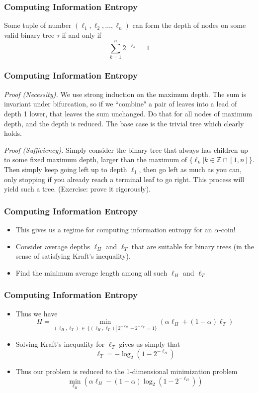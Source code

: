 \documentclass[xcolor=dvipsnames]{beamer}
\begin{document}
	\begin{frame}
	\frametitle{Computing Information Entropy}
    	\begin{theorem}
	    Some tuple of number $(\ell_1, \ell_2, \dots, \ell_n)$ can form the depth of nodes on some valid binary tree $\tau$ if and only if $$ \sum_{k=1}^n 2^{-\ell_k} = 1$$      	
	    \end{theorem}
	\end{frame}
	
	\begin{frame}
	\frametitle{Computing Information Entropy}
    \textit{Proof (Necessity).} We use strong induction on the maximum depth. The sum is invariant under bifurcation, so if we ``combine" a pair of leaves into a lead of depth 1 lower, that leaves the sum unchanged. Do that for all nodes of maximum depth, and the depth is reduced. The base case is the trivial tree which clearly holds. 
    
    \textit{Proof (Sufficiency).} Simply consider the binary tree that always has children up to some fixed maximum depth, larger than the maximum of $\{\ell_k | k \in \mathbb{Z} \cap [1, n] \}$. Then simply keep going left up to depth $\ell_1$, then go left as much as you can, only stopping if you already reach a terminal leaf to go right. This process will yield such a tree. (Exercise: prove it rigorously). 
	\end{frame}
	
	\begin{frame}
	\frametitle{Computing Information Entropy}
	    \begin{itemize}
	        \item This gives us a regime for computing information entropy for an $\alpha$-coin!
	        \pause
	        \item Consider average depths $\ell_H$ and $\ell_T$ that are suitable for binary trees (in the sense of satisfying Kraft's inequality). 
	        \pause
	        \item Find the minimum average length among all such $\ell_H$ and $\ell_T$
	    \end{itemize}
	\end{frame}
	
	\begin{frame}
	\frametitle{Computing Information Entropy}
    	\begin{itemize}
    	    \item Thus we have $$ H = \min_{(\ell_H, \ell_T) \ \in \ \{(\ell_H, \ell_T) \left| \ 2^{-\ell_H} + 2^{-\ell_T} = 1  \}\right.}\left(\alpha \ell_H + (1-\alpha ) \ell_T\right) $$
    	    \pause
    	    \item Solving Kraft's inequality for $\ell_T$ gives us simply that $$ \ell_T = -\log_2\left( 1 - 2^{-\ell_H} \right)$$
    	    \pause
    	    \item Thus our problem is reduced to the 1-dimensional minimization problem $$ \min_{\ell_H} \left( \alpha \ell_H - (1 - \alpha) \log_2\left( 1 - 2^{-\ell_H} \right) \right)$$
    	\end{itemize}
	\end{frame}
	
\end{document}
